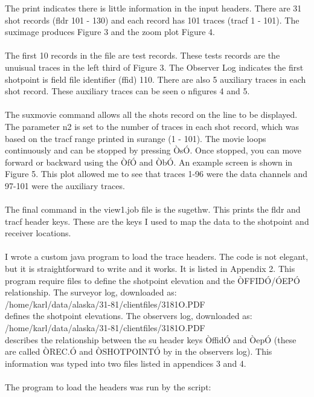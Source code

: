 The print indicates there is little information in the input headers.  There are 31 shot records (fldr 101 - 130) and each record has 101 traces (tracf 1 - 101).  The suximage produces Figure 3 and the zoom plot Figure 4.\\
\\
The first 10 records in the file are test records.  These tests records are the unuisual traces in the left third of Figure 3.  The Observer Log indicates the first shotpoint is field file identifier (ffid) 110.  There are also 5 auxiliary traces in each shot record.  These auxiliary traces can be seen o nfigures 4 and 5. \\
\\
The suxmovie command allows all the shots record on the line to be displayed.  The parameter n2 is set to the number of traces in each shot record, which was based on the tracf range printed in surange (1 - 101).  The movie loops continuously and can be stopped by pressing ÒsÓ.  Once stopped, you can move forward or backward using the ÒfÓ and ÒbÓ.  An example screen is shown in Figure 5.  This plot allowed me to see that traces 1-96 were the data channels and 97-101 were the auxiliary traces.\\
\\
The final command in the view1.job file is the sugethw.  This prints the fldr and tracf header keys.  These are the keys I used to map the data to the shotpoint and receiver locations.\\
\\
I wrote a custom java program to load the trace headers.  The code is not elegant, but it is straightforward to write and it works.  It is listed in Appendix 2.  This program require files to define the shotpoint elevation and the ÒFFIDÓ/ÓEPÓ relationship.  The surveyor log, downloaded as:\\
/home/karl/data/alaska/31-81/clientfiles/3181O.PDF \\
defines the shotpoint elevations.  The observers log, downloaded as:\\
/home/karl/data/alaska/31-81/clientfiles/3181O.PDF \\
describes the relationship between the su header keys ÒffidÓ  and ÒepÓ  (these are called ÒREC.Ó and ÒSHOTPOINTÓ by in the observers log).   This information was typed into two files listed in appendices 3 and 4.\\
\\
The program to load the headers was run by the script:\\
